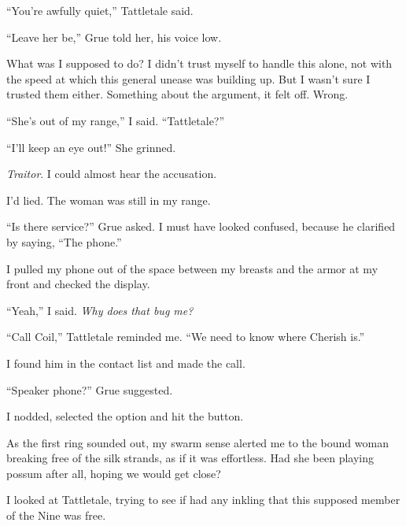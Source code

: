 ``You're awfully quiet,'' Tattletale said.



``Leave her be,'' Grue told her, his voice low.



What was I supposed to do?  I didn't trust myself to handle this alone, not with the speed at which this general unease was building up.  But I wasn't sure I trusted them either.  Something about the argument, it felt off.  Wrong.



``She's out of my range,'' I said.  ``Tattletale?''



``I'll keep an eye out!''  She grinned.



\emph{Traitor}.  I could almost hear the accusation.



I'd lied.  The woman was still in my range.



``Is there service?''  Grue asked.  I must have looked confused, because he clarified by saying, ``The phone.''



I pulled my phone out of the space between my breasts and the armor at my front and checked the display.



``Yeah,'' I said.  \emph{Why does that bug me?}



``Call Coil,'' Tattletale reminded me.  ``We need to know where Cherish is.''



I found him in the contact list and made the call.



``Speaker phone?'' Grue suggested.



I nodded, selected the option and hit the button.



As the first ring sounded out, my swarm sense alerted me to the bound woman breaking free of the silk strands, as if it was effortless.  Had she been playing possum after all, hoping we would get close?



I looked at Tattletale, trying to see if had any inkling that this supposed member of the Nine was free.



